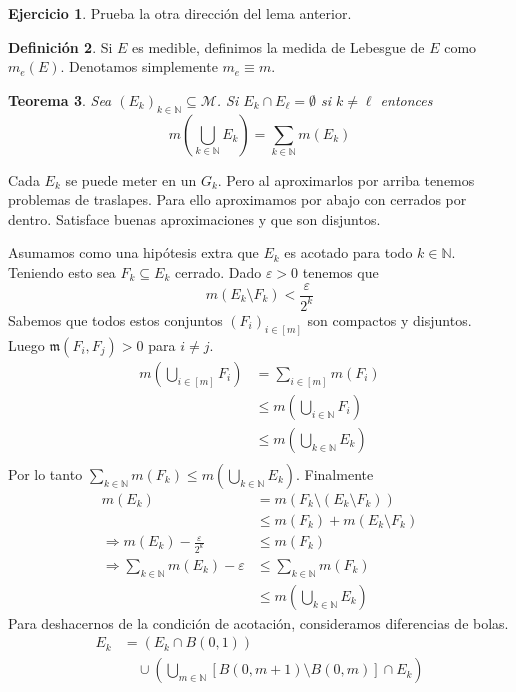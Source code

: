 \documentclass[12pt]{article}
\theoremstyle{plain}
\newtheorem{Th}{Teorema}[subsection]   %
\theoremstyle{definition}
\newtheorem{Def}[Th]{Definición}       %
\newtheorem{Ej}[Th]{Ejercicio}
\theoremstyle{remark}
\numberwithin{equation}{section}
\newcommand{\bN}{\mathbb{N}}        %
\newcommand{\mm}{\mathfrak{m}}      %
\newcommand{\cM}{\mathcal{M}}       %
\renewcommand{\leq}{\leqslant}      %
\renewcommand{\:}{\colon}           %
\newcommand{\bonj}[1]{\left\lbrack#1\right\rbrack}
\begin{document}
\begin{multicols}{2}
\begin{Ej}
  Prueba la otra dirección del lema anterior.
\end{Ej}

\begin{Def}\label{def:medidaDeLebesgue}
  Si $E$ es medible, definimos la medida de Lebesgue de $E$ como $m_e(E)$. Denotamos simplemente $m_e\equiv m$.
\end{Def}

\begin{Th}
  Sea $(E_k)_{k\in\bN}\subseteq\cM$. Si $E_k\cap E_\ell=\emptyset$ si $k\neq \ell$ entonces
  $$m\left(\bigcup_{k\in\bN}E_k\right)=\sum_{k\in\bN}m(E_k)$$
\end{Th}

Cada $E_k$ se puede meter en un $G_k$. Pero al aproximarlos por arriba tenemos problemas de traslapes. Para ello aproximamos por abajo con cerrados por dentro. Satisface buenas aproximaciones y que son disjuntos.

\begin{ptcbp}
Asumamos como una hipótesis extra que $E_k$ es acotado para todo $k\in\bN$. Teniendo esto sea $F_k\subseteq E_k$ cerrado. Dado $\varepsilon>0$ tenemos que
$$m(E_k\setminus F_k)<\frac{\varepsilon}{2^k}$$
Sabemos que todos estos conjuntos $(F_i)_{i\in\bonj{m}}$ son compactos y disjuntos. Luego $\mm(F_i,F_j)>0$ para $i\neq j$.
\begin{align*}
  m\left(\bigcup_{i\in\bonj{m}}F_i\right) & =\sum_{i\in\bonj{m}} m(F_i)\\
   &\leq m\left(\bigcup_{i\in\bN}F_i\right) \\
   &\leq m\left(\bigcup_{k\in\bN}E_k\right) \\
\end{align*}
Por lo tanto $\sum_{k\in\bN} m(F_k)\leq m\left(\bigcup_{k\in\bN}E_k\right)$. Finalmente
\begin{align*}
  m(E_k) &=m(F_k\setminus(E_k\setminus F_k))\\
  &\leq m(F_k)+m(E_k\setminus F_k)\\
  \Rightarrow m(E_k)-\frac{\varepsilon}{2^k}&\leq m(F_k)\\
  \Rightarrow \sum_{k\in\bN} m(E_k)- \varepsilon &\leq \sum_{k\in\bN} m(F_k)\\
  &\leq m\left(\bigcup_{k\in\bN}E_k\right)
\end{align*}
Para deshacernos de la condición de acotación, consideramos diferencias de bolas.
\begin{align*}
  E_k & =(E_k\cap B(0,1))\\
  &\quad \cup\left(\bigcup_{m\in\bN}\bonj{B(0,m+1)\setminus B(0,m)}\cap E_k\right)
\end{align*}


\end{ptcbp}
\end{multicols}
\end{document}
